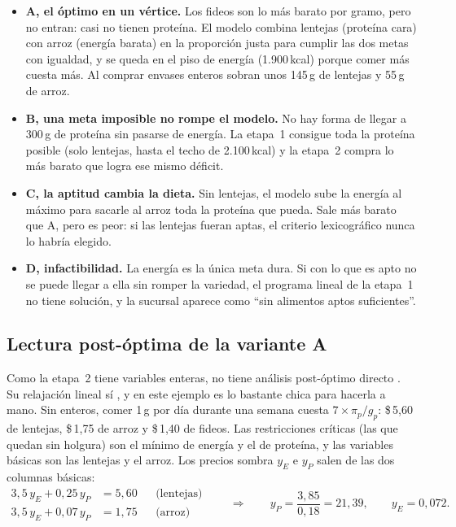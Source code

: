 \documentclass[10pt,a4paper]{article}
\newcommand{\pesos}[1]{\$\,#1}
\begin{document}
\begin{itemize}
  \item \textbf{A, el óptimo en un vértice.} Los fideos son lo más barato por gramo,
        pero no entran: casi no tienen proteína. El modelo combina lentejas (proteína
        cara) con arroz (energía barata) en la proporción justa para cumplir las dos
        metas con igualdad, y se queda en el piso de energía (1.900\,kcal) porque
        comer más cuesta más. Al comprar envases enteros sobran unos 145\,g de
        lentejas y 55\,g de arroz.
  \item \textbf{B, una meta imposible no rompe el modelo.} No hay forma de llegar a
        300\,g de proteína sin pasarse de energía. La etapa~1 consigue toda la
        proteína posible (solo lentejas, hasta el techo de 2.100\,kcal) y la etapa~2
        compra lo más barato que logra ese mismo déficit.
  \item \textbf{C, la aptitud cambia la dieta.} Sin lentejas, el modelo sube la
        energía al máximo para sacarle al arroz toda la proteína que pueda. Sale más
        barato que A, pero es peor: si las lentejas fueran aptas, el criterio
        lexicográfico nunca lo habría elegido.
  \item \textbf{D, infactibilidad.} La energía es la única meta dura. Si con lo que es
        apto no se puede llegar a ella sin romper la variedad, el programa lineal de
        la etapa~1 no tiene solución, y la sucursal aparece como ``sin alimentos
        aptos suficientes''.
\end{itemize}

\subsection{Lectura post-óptima de la variante A}
\label{sec:postoptimo}

Como la etapa~2 tiene variables enteras, no tiene análisis post-óptimo directo
\cite{clase-mip}. Su relajación lineal sí \cite{clase-sens}, y en este ejemplo es lo
bastante chica para hacerla a mano. Sin enteros, comer 1\,g por día durante una
semana cuesta $7 \times \pi_p / g_p$: \pesos{5,60} de lentejas, \pesos{1,75} de arroz
y \pesos{1,40} de fideos. Las restricciones críticas (las que quedan sin holgura)
son el mínimo de energía y el de proteína, y las variables básicas son las lentejas y
el arroz. Los precios sombra $y_E$ e $y_P$ salen de las dos columnas básicas:
\[
\begin{aligned}
3{,}5\, y_E + 0{,}25\, y_P &= 5{,}60 && \text{(lentejas)} \\
3{,}5\, y_E + 0{,}07\, y_P &= 1{,}75 && \text{(arroz)}
\end{aligned}
\qquad\Longrightarrow\qquad
y_P = \frac{3{,}85}{0{,}18} = 21{,}39, \qquad y_E = 0{,}072.
\]
\end{document}

